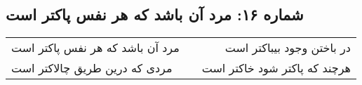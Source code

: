 \begin{center}
\section*{شماره ۱۶: مرد آن باشد که هر نفس پاکتر است}
\label{sec:016}
\begin{longtable}{l p{0.5cm} r}
مرد آن باشد که هر نفس پاکتر است
&&
در باختن وجود بیباکتر است
\\
مردی که درین طریق چالاکتر است
&&
هرچند که پاکتر شود خاکتر است
\\
\end{longtable}
\end{center}
